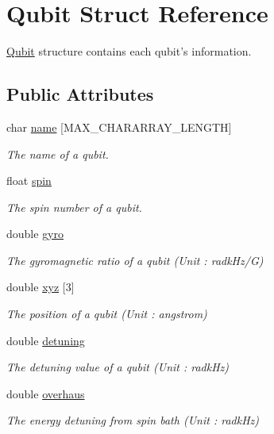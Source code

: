 \hypertarget{structQubit}{\section{Qubit Struct Reference}
\label{structQubit}
}


\hyperlink{structQubit}{Qubit} structure contains each qubit's information.  


\subsection*{Public Attributes}
\begin{DoxyCompactItemize}
\item 
char \hyperlink{structQubit_ab65a0dfa0efbd8a7862403f4704c1587}{name} \mbox{[}M\-A\-X\-\_\-\-C\-H\-A\-R\-A\-R\-R\-A\-Y\-\_\-\-L\-E\-N\-G\-T\-H\mbox{]}
\begin{DoxyCompactList}\small\item\em The name of a qubit. \end{DoxyCompactList}\item 
float \hyperlink{structQubit_a858930b7d9d9cafc70f26ab7993dadad}{spin}
\begin{DoxyCompactList}\small\item\em The spin number of a qubit. \end{DoxyCompactList}\item 
double \hyperlink{structQubit_a668a62d3ddf72e6b9acbc6338c97090f}{gyro}
\begin{DoxyCompactList}\small\item\em The gyromagnetic ratio of a qubit (Unit \-: radk\-Hz/\-G) \end{DoxyCompactList}\item 
double \hyperlink{structQubit_a799cb32b473160eb8e9e4aa6c9c39b18}{xyz} \mbox{[}3\mbox{]}
\begin{DoxyCompactList}\small\item\em The position of a qubit (Unit \-: angstrom) \end{DoxyCompactList}\item 
double \hyperlink{structQubit_a6e0e926587994ef24d67431d0dbef9e7}{detuning}
\begin{DoxyCompactList}\small\item\em The detuning value of a qubit (Unit \-: radk\-Hz) \end{DoxyCompactList}\item 
double \hyperlink{structQubit_aecb3943042094c4be043f375626dbd24}{overhaus}
\begin{DoxyCompactList}\small\item\em The energy detuning from spin bath (Unit \-: radk\-Hz) \end{DoxyCompactList}\item 

\end{DoxyCompactItemize}
